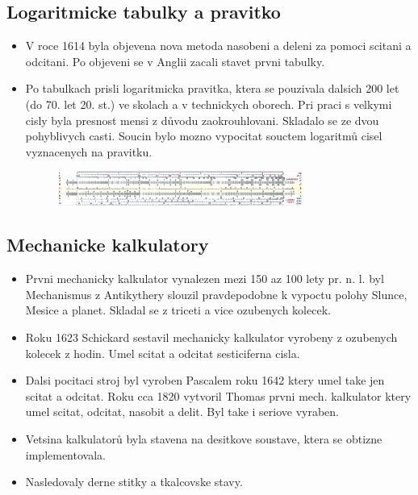 \documentclass[a4paper,12pt]{article}
\begin{document}
    \subsection{Logaritmicke tabulky a pravitko}
        \begin{itemize}
            \item{V roce 1614 byla objevena nova metoda nasobeni a deleni za pomoci scitani a odcitani. Po objeveni se v Anglii zacali stavet prvni tabulky.} 
            \item{Po tabulkach prisli logaritmicka pravitka, ktera se pouzivala dalsich 200 let (do 70. let 20. st.) ve skolach a v technickych oborech. Pri praci s velkymi cisly byla presnost mensi z důvodu zaokrouhlovani. Skladalo se ze dvou pohyblivych casti. Soucin bylo mozno vypocitat souctem logaritmů cisel vyznacenych na pravitku.}
            \begin{figure}[htp]
                \centering
                \includegraphics[width=8cm]{TVP_11_9_23@3.jpg}
            \end{figure}
        \end{itemize}
    \subsection{Mechanicke kalkulatory}
        \begin{itemize}
            \item{Prvni mechanicky kalkulator vynalezen mezi 150 az 100 lety pr. n. l. byl Mechanismus z Antikythery slouzil pravdepodobne k vypoctu polohy Slunce, Mesice a planet. Skladal se z triceti a vice ozubenych kolecek.}
            \item{Roku 1623 Schickard sestavil mechanicky kalkulator vyrobeny z ozubenych kolecek z hodin. Umel scitat a odcitat sesticiferna cisla.}
            \item{Dalsi pocitaci stroj byl vyroben Pascalem roku 1642 ktery umel take jen scitat a odcitat.  Roku  cca 1820 vytvoril Thomas prvni mech. kalkulator ktery umel scitat, odcitat, nasobit a delit. Byl take i seriove vyraben.}
            \item{Vetsina kalkulatorů byla stavena na desitkove soustave, ktera se obtizne implementovala.}
            \item{Nasledovaly derne stitky a tkalcovske stavy.}
        \end{itemize}
        
\end{document}
